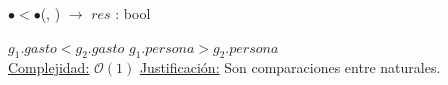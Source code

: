 \begin{Algoritmos}
   
    \begin{algorithm}
    \caption{\textbf{$\bullet < \bullet$}(, ) $\to$ $res$ : bool}
    \begin{algorithmic}
            \State \Return $g_1.gasto < g_2.gasto$
        \EndIf
        \State \Return $g_1.persona > g_2.persona$
        \\
        \Statex \underline{Complejidad:} $\mathcal{O}(1)$
        \Statex \underline{Justificación:} Son comparaciones entre naturales.
    \end{algorithmic}
    \end{algorithm}

\end{Algoritmos}